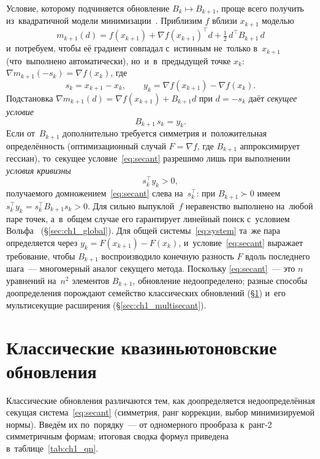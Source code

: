 Условие, которому подчиняется обновление $B_k\mapsto B_{k+1}$, проще
всего получить из~квадратичной модели минимизации~\cite[\S6.1]{bfgs}.
Приблизим $f$ вблизи $x_{k+1}$ моделью
\[
  m_{k+1}(d) = f(x_{k+1}) + \nabla f(x_{k+1})^\top d
               + \tfrac12\, d^\top B_{k+1}\, d
\]
и~потребуем, чтобы её градиент совпадал с~истинным не~только в~$x_{k+1}$
(что~выполнено автоматически), но~и~в~предыдущей точке $x_k$:
$\nabla m_{k+1}(-s_k)=\nabla f(x_k)$, где
\[
  s_k = x_{k+1} - x_k, \qquad y_k = \nabla f(x_{k+1}) - \nabla f(x_k).
\]
Подстановка $\nabla m_{k+1}(d)=\nabla f(x_{k+1})+B_{k+1}d$ при $d=-s_k$
даёт \emph{секущее условие}
\begin{equation}\label{eq:secant}
  B_{k+1}\, s_k = y_k.
\end{equation}
Если от~$B_{k+1}$ дополнительно требуется симметрия и~положительная
определённость (оптимизационный случай $F=\nabla f$, где $B_{k+1}$
аппроксимирует гессиан), то~секущее условие~\eqref{eq:secant} разрешимо
лишь при выполнении \emph{условия кривизны}
\begin{equation}\label{eq:curvature}
  s_k^\top y_k > 0,
\end{equation}
получаемого домножением~\eqref{eq:secant} слева на~$s_k^\top$: при
$B_{k+1}\succ 0$ имеем $s_k^\top y_k = s_k^\top B_{k+1} s_k > 0$. Для
сильно выпуклой~$f$ неравенство выполнено на~любой паре точек,
а~в~общем случае его гарантирует линейный поиск с~условием
Вольфа~\cite{wolfe1969} (\S\ref{sec:ch1_global}).
Для общей системы~\eqref{eq:system} та~же пара определяется через
$y_k = F(x_{k+1}) - F(x_k)$, и~условие~\eqref{eq:secant} выражает
требование, чтобы $B_{k+1}$ воспроизводило конечную разность $F$ вдоль
последнего шага~--- многомерный аналог секущего метода. Поскольку
\eqref{eq:secant}~--- это $n$ уравнений на~$n^2$ элементов $B_{k+1}$,
обновление недоопределено; разные способы доопределения порождают
семейство классических обновлений (\S\ref{sec:ch1_classical}) и~его
мультисекущие расширения (\S\ref{sec:ch1_multisecant}).


\section{Классические квазиньютоновские обновления}\label{sec:ch1_classical}

Классические обновления различаются тем, как доопределяется
недоопределённая секущая система~\eqref{eq:secant} (симметрия, ранг
коррекции, выбор минимизируемой нормы). Введём их по~порядку~--- от
одномерного прообраза к~ранг-2 симметричным формам; итоговая сводка
формул приведена в~таблице~\ref{tab:ch1_qn}.


